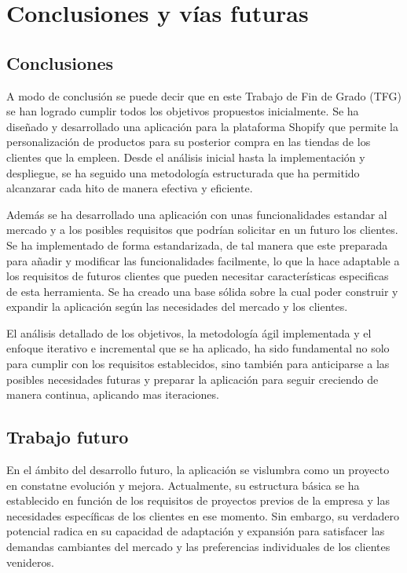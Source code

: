 \documentclass[12pt]{article}
\begin{document}
\newpage
\section{Conclusiones y vías futuras}

\subsection{Conclusiones}
A modo de conclusión se puede decir que en este Trabajo de Fin de Grado (TFG) se han logrado cumplir todos
los objetivos propuestos inicialmente. Se ha diseñado y desarrollado una aplicación para la plataforma Shopify que 
permite la personalización de productos para su posterior compra en las tiendas de los clientes que la empleen.
Desde el análisis inicial hasta la implementación y despliegue, se ha seguido una metodología estructurada que ha permitido
alcanzarar cada hito de manera efectiva y eficiente.

Además se ha desarrollado una aplicación con unas funcionalidades estandar al mercado y a los posibles requisitos que podrían solicitar en un futuro
los clientes. Se ha implementado de forma estandarizada, de tal manera que este preparada para añadir y modificar las funcionalidades facilmente, lo que la hace
adaptable a los requisitos de futuros clientes que pueden necesitar características especificas de esta herramienta.
Se ha creado una base sólida sobre la cual poder construir y expandir la aplicación según las necesidades del mercado y los clientes.

El análisis detallado de los objetivos, la metodología ágil implementada y el enfoque iterativo e incremental que se ha aplicado,
ha sido fundamental no solo para cumplir con los requisitos establecidos, sino también para anticiparse a las posibles necesidades futuras y
preparar la aplicación para seguir creciendo de manera continua, aplicando mas iteraciones.

\subsection{Trabajo futuro}
En el ámbito del desarrollo futuro, la aplicación se vislumbra como un proyecto en constatne evolución y mejora. Actualmente, su estructura básica se ha 
establecido en función de los requisitos de proyectos previos de la empresa y las necesidades específicas de los clientes en ese momento. Sin embargo, su 
verdadero potencial radica en su capacidad de adaptación y expansión para satisfacer las demandas cambiantes del mercado y las preferencias individuales de los 
clientes venideros.
\end{document}
